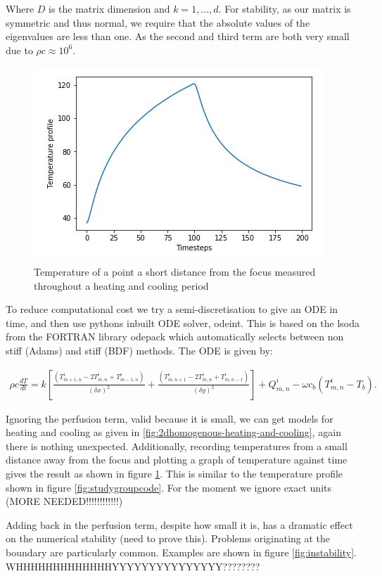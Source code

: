 \documentclass[11pt]{article} %
\begin{document}
Where $D$ is the matrix dimension and $k=1,...,d$. For stability, as our matrix is symmetric and thus normal, we require that the absolute values of the  eigenvalues are less than one. As the second and third term are both very small due to $\rho c \approx 10^6$. 


\begin{figure}
	\centering
	\includegraphics[width=0.7\linewidth]{Report_images/study_group_code_2D_model}
	\caption{Temperature of a point a short distance from the focus measured throughout a heating and cooling period}
	\label{fig:studygroupcode2dmodel}
\end{figure}


To reduce computational cost we try a semi-discretisation to give an ODE in time, and then use pythons inbuilt ODE solver, odeint. This is based on the  lsoda from the FORTRAN library odepack which automatically selects between non stiff (Adams) and stiff (BDF) methods. The ODE is given by:

\begin{eqnarray}
\rho c \frac{dT}{dt}= k\left[  \frac{(T^i_{m+1,n}-2T^i_{m,n}+T^i_{m-1,n})}{(\delta x)^2}+\frac{(T^i_{m,n+1}-2T^i_{m,n}+T^i_{m,n-1})}{(\delta y)^2}\right] +Q^i_{m,n}-\omega c_b(T^i_{m,n}-T_b).
\end{eqnarray}

Ignoring the perfusion term, valid because it is small, we can get models for heating and cooling as given in \ref{fig:2dhomogenous-heating-and-cooling}, again there is nothing unexpected. Additionally, recording temperatures from a small distance away from the focus and plotting a graph of temperature against time gives the result as shown in figure \ref{fig:studygroupcode2dmodel}. This is similar to the temperature profile shown in figure \ref{fig:studygroupcode}. For the moment we ignore exact units (MORE NEEDED!!!!!!!!!!!!)

Adding back in the perfusion term, despite how small it is, has a dramatic effect on the numerical stability (need to prove this). Problems originating at the boundary are particularly common. Examples are shown in figure \ref{fig:instability}. WHHHHHHHHHHHHHYYYYYYYYYYYYYYY????????
\end{document}
